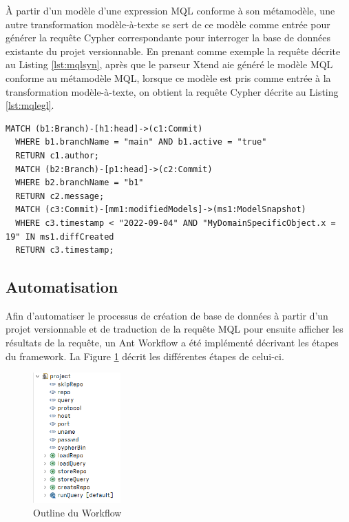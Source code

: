 \documentclass[12pt, titlepage]{article}
\begin{document}
À partir d'un modèle d'une expression MQL conforme à son métamodèle, une autre
transformation modèle-à-texte se sert de ce modèle comme entrée pour générer la
requête Cypher correspondante pour interroger la base de données existante du
projet versionnable. En prenant comme exemple la requête décrite au Listing
\ref{lst:mqlsyn}, après que le parseur Xtend aie généré le modèle MQL conforme
au métamodèle MQL, lorsque ce modèle est pris comme entrée à la transformation
modèle-à-texte, on obtient la requête Cypher décrite au Listing
\ref{lst:mqlegl}.

\begin{lstlisting}[style=cypher, label=lst:mqlegl,caption=Cypher générée]
  MATCH (b1:Branch)-[h1:head]->(c1:Commit)
  WHERE b1.branchName = "main" AND b1.active = "true"
  RETURN c1.author;
  MATCH (b2:Branch)-[p1:head]->(c2:Commit)
  WHERE b2.branchName = "b1"
  RETURN c2.message;
  MATCH (c3:Commit)-[mm1:modifiedModels]->(ms1:ModelSnapshot)
  WHERE c3.timestamp < "2022-09-04" AND "MyDomainSpecificObject.x = 19" IN ms1.diffCreated
  RETURN c3.timestamp;
\end{lstlisting}

\subsection*{Automatisation}

Afin d'automatiser le processus de création de base de données à partir d'un
projet versionnable et de traduction de la requête MQL pour ensuite afficher les
résultats de la requête, un Ant Workflow a été implémenté décrivant les étapes
du framework. La Figure \ref{fig:wfoutline} décrit les différentes étapes de
celui-ci.

\begin{figure}[ht!]
  \centering
  \includegraphics[width=0.3\textwidth]{wfoutline.png}
  \caption{Outline du Workflow}
  \label{fig:wfoutline}
\end{figure}
\end{document}
